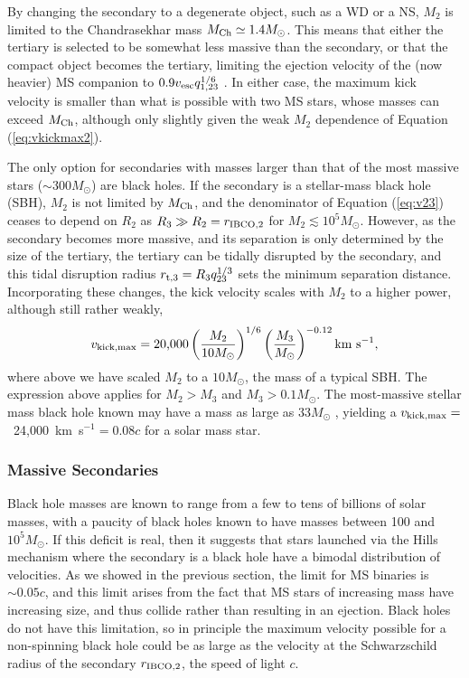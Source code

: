 \documentclass[a4paper,twocolumn]{emulateapj}
\begin{document}
{By changing the secondary to a degenerate object, such as a WD or a NS, $M_{2}$ is limited to the Chandrasekhar mass $M_{\rm Ch} \simeq 1.4 M_{\odot}$. This means that either the tertiary is selected to be somewhat less massive than the secondary, or that the compact object becomes the tertiary, limiting the ejection velocity of the (now heavier) MS companion to $0.9 v_{\rm esc} q_{1,23}^{\smash{1/6}}$ \citep{Sari:2010a}. In either case, the maximum kick velocity is smaller than what is possible with two MS stars, whose masses can exceed $M_{\rm Ch}$, although only slightly given the weak $M_{2}$ dependence of Equation (\ref{eq:vkickmax2}).

The only option for secondaries with masses larger than that of the most massive stars ($\sim 300 M_{\odot}$) are black holes. If the secondary is a stellar-mass black hole (SBH), $M_{2}$ is not limited by $M_{\rm Ch}$, and the denominator of Equation (\ref{eq:v23}) ceases to depend on $R_{2}$ as $R_{3} \gg R_{2} = r_{\rm IBCO,2}$ for $M_{2} \lesssim 10^{5} M_{\odot}$. However, as the secondary becomes more massive, and its separation is only determined by the size of the tertiary, the tertiary can be tidally disrupted by the secondary, and this tidal disruption radius $r_{\rm t, 3} = R_{3} q_{23}^{\smash{1/3}}$ sets the minimum separation distance. Incorporating these changes, the kick velocity scales with $M_{2}$ to a higher power, although still rather weakly,
\begin{equation}
v_{\rm kick,\max} = \textrm{20,000} \left(\frac{M_2}{10 M_{\odot}}\right)^{1/6} \left(\frac{M_3}{M_{\odot}}\right)^{-0.12} \textrm{km~s$^{-1}$}\label{eq:vkickmax3},
\end{equation}
where above we have scaled $M_{2}$ to a $10 M_{\odot}$, the mass of a typical SBH. The expression above applies for $M_{2} > M_{3}$ and $M_{3} > 0.1 M_{\odot}$. The most-massive stellar mass black hole known may have a mass as large as $33 M_{\odot}$ \citep{Silverman:2008a}, yielding a $v_{\rm kick,\max} = $~24,000~km~s$^{-1} = 0.08 c$ for a solar mass star.

\subsubsection{Massive Secondaries}
Black hole masses are known to range from a few to tens of billions of solar masses, with a paucity of black holes known to have masses between 100 and $10^{5} M_{\odot}$. If this deficit is real, then it suggests that stars launched via the Hills mechanism where the secondary is a black hole have a bimodal distribution of velocities. As we showed in the previous section, the limit for MS binaries is $\sim 0.05 c$, and this limit arises from the fact that MS stars of increasing mass have increasing size, and thus collide rather than resulting in an ejection. Black holes do not have this limitation, so in principle the maximum velocity possible for a non-spinning black hole could be as large as the velocity at the Schwarzschild radius of the secondary $r_{\rm IBCO,2}$, the speed of light $c$.

}
\end{document}
